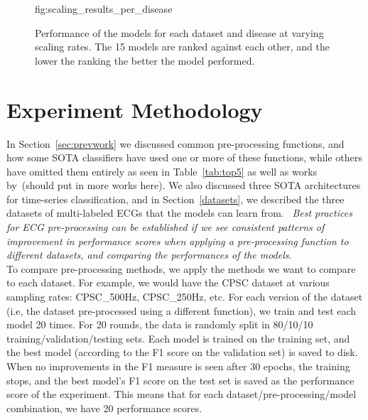 \documentclass[pmlr,twocolumn]{jmlr}%
\begin{document}
\begin{figure}[t]
\floatconts
  {fig:scaling_results_per_disease}
  {\caption{Performance of the models for each dataset and disease at varying scaling rates. The 15 models are ranked against each other, and the lower the ranking the better the model performed. }}
  {
  
  
  }
\end{figure}
\section{Experiment Methodology}
\label{sec:experiment}

In Section~\ref{sec:prevwork} we discussed common pre-processing functions, and how some SOTA classifiers have used one or more of these functions, while others have omitted them entirely as seen in Table~\ref{tab:top5} as well as works by~\cite{ribeiro2020automatic}{\color{red}(should put in more works here)}. We also discussed three SOTA architectures for time-series classification, and in Section~\ref{datasets}, we described the three datasets of multi-labeled ECGs that the models can learn from. ~\textit{Best practices for ECG pre-processing can be established if we see consistent patterns of improvement in performance scores when applying a pre-processing function to different datasets, and comparing the performances of the models}. \\

To compare pre-processing methods, we apply the methods we want to compare to each dataset. For example, we would have the CPSC dataset at various sampling rates: CPSC\_500Hz, CPSC\_250Hz, etc. For each version of the dataset (i.e, the dataset pre-processed using a different function), we train and test each model 20 times. For 20 rounds, the data is randomly split in 80/10/10 training/validation/testing sets. Each model is trained on the training set, and the best model (according to the F1 score on the validation set) is saved to disk. When no improvements in the F1 measure is seen after 30 epochs, the training stops, and the best model's F1 score on the test set is saved as the performance score of the experiment. This means that for each dataset/pre-processing/model combination, we have 20 performance scores. 
\end{document}
